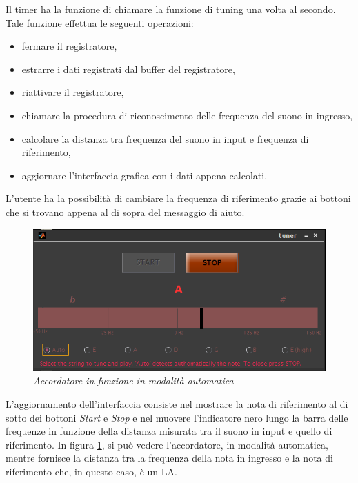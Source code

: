 Il timer ha la funzione di chiamare la funzione di tuning una volta al secondo. 
Tale funzione effettua le seguenti operazioni:
\begin{itemize}
	\item fermare il registratore,
	\item estrarre i dati registrati dal buffer del registratore,
	\item riattivare il registratore,
	\item chiamare la procedura di riconoscimento delle frequenza del suono in ingresso,
	\item calcolare la distanza tra frequenza del suono in input e frequenza di riferimento,
	\item aggiornare l'interfaccia grafica con i dati appena calcolati.
\end{itemize}

L'utente ha la possibilità di cambiare la frequenza di riferimento grazie ai bottoni che si trovano appena al di sopra del messaggio di aiuto.

	\begin{figure}[h]
	  \begin{center} 
	    \includegraphics[width=\textwidth*\real{0.8}]{images/ch_07/accordatore_auto.png}
	  \end{center} 
	  \caption{\textit{Accordatore in funzione in modalità automatica}}  
	  \label{fig:accordatore_in_funzione}
	\end{figure}

L'aggiornamento dell'interfaccia consiste nel mostrare la nota di riferimento al di sotto dei bottoni \emph{Start} e \emph{Stop} e nel muovere l'indicatore nero lungo la barra delle frequenze in funzione della distanza misurata tra il suono in input e quello di riferimento. 
In figura \ref{fig:accordatore_in_funzione}, si può vedere l'accordatore, in modalità automatica, mentre fornisce la distanza tra la frequenza della nota in ingresso e la nota di riferimento che, in questo caso, è un LA.



